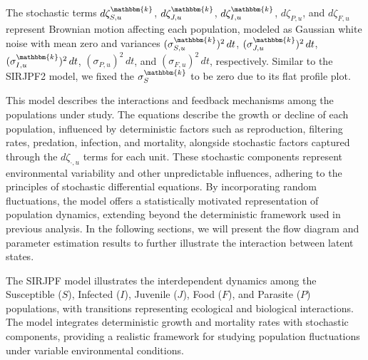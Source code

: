\documentclass[aoas,preprint]{imsart}\usepackage[]{graphicx}\usepackage[]{xcolor}
\newcommand\unit{u}
\newcommand\species{\mathbbm{k}}
\begin{document}
The stochastic terms $d\zeta^{\species}_{S,{\unit}}$, $d\zeta^{\species}_{J,{\unit}}$, $d\zeta^{\species}_{I,{\unit}}$, $d\zeta_{P,{\unit}}$, and $d\zeta_{F,{\unit}}$ represent Brownian motion affecting each population, modeled as Gaussian white noise with mean zero and variances $(\sigma^{\species}_{S,{\unit}})^{2}\, dt$, $(\sigma^{\species}_{J,{\unit}})^{2}\, dt$, $(\sigma^{\species}_{I,{\unit}})^{2}\, dt$, $(\sigma_{P,{\unit}})^{2}\, dt$, and $(\sigma_{F,{\unit}})^{2}\, dt$, respectively.
Similar to the SIRJPF2 model, we fixed the $\sigma^{\species}_{S}$ to be zero due to its flat profile plot.
\parskip 3mm

This model describes the interactions and feedback mechanisms among the populations under study.
The equations describe the growth or decline of each population, influenced by deterministic factors such as reproduction, filtering rates, predation, infection, and mortality, alongside stochastic factors captured through the $d\zeta_{\cdot,u}$ terms for each unit.
These stochastic components represent environmental variability and other unpredictable influences, adhering to the principles of stochastic differential equations.
By incorporating random fluctuations, the model offers a statistically motivated representation of population dynamics, extending beyond the deterministic framework used in previous analysis.
In the following sections, we will present the flow diagram and parameter estimation results to further illustrate the interaction between latent states.

The SIRJPF model illustrates the interdependent dynamics among the Susceptible ($S$), Infected ($I$), Juvenile ($J$), Food ($F$), and Parasite ($P$) populations, with transitions representing ecological and biological interactions.
The model integrates deterministic growth and mortality rates with stochastic components, providing a realistic framework for studying population fluctuations under variable environmental conditions.

\usetikzlibrary{positioning}
\usetikzlibrary {arrows.meta}
\usetikzlibrary{shapes.geometric}
\end{document}
